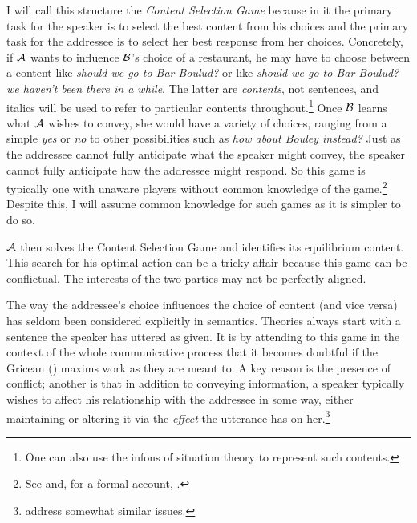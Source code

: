 I will call this structure the \emph{Content Selection Game} because in it the primary task for the speaker is to select the best content from his choices and the primary task for the addressee is to select her best response from her choices. Concretely, if $\cal A$ wants to influence $\cal B$'s choice of a restaurant, he may have to choose between a content like \emph{should we go to Bar Boulud?} or like \emph{should we go to Bar Boulud? we haven't been there in a while}. The latter are \emph{contents}, not sentences, and italics will be used to refer to particular contents throughout.\footnote{One can also use the infons of situation theory to represent such contents.} Once $\cal B$ learns what $\cal A$ wishes to convey, she would have a variety of choices, ranging from a simple \emph{yes} or \emph{no} to other possibilities such as \emph{how about Bouley instead?} Just as the addressee cannot fully anticipate what the speaker might convey, the speaker cannot fully anticipate how the addressee might respond. So this game is typically one with unaware players without common knowledge of the game.\footnote{See \citet[Sections~5.3 and 6.5]{parikh:ul} and, for a formal account, \citet{hr:egpup,hr:gscgpup}.\label{foot:halpern}} Despite this, I will assume common knowledge for such games as it is simpler to do so.

$\cal A$ then solves the Content Selection Game and identifies its equilibrium content. This search for his optimal action can be a tricky affair because this game can be conflictual. The interests of the two parties may not be perfectly aligned. 



The way the addressee's choice influences the choice of content (and vice versa) has seldom been considered explicitly in semantics. Theories always start with a sentence the speaker has uttered as given. It is by attending to this game in the context of the whole communicative process that it becomes doubtful if the Gricean (\citeyear{grice:lc}) maxims work as they are meant to. A key reason is the presence of conflict; another is that in addition to conveying information, a speaker typically wishes to affect his relationship with the addressee in some way, either maintaining or altering it via the \emph{effect} the utterance has on her.\footnote{\citet{al:sc} address somewhat similar issues.}

